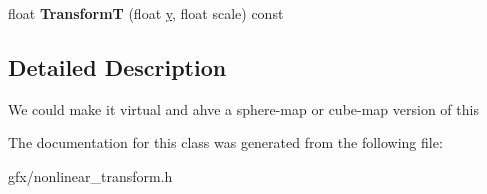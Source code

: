 \begin{DoxyCompactItemize}
\item 
float {\bfseries TransformT} (float \hyperlink{IceUtils_8h_aa7ffaed69623192258fb8679569ff9ba}{y}, float scale) const \hypertarget{classIdentityTransform_ab473c2f60a64238a9d69a45ec53b1869}{}\label{classIdentityTransform_ab473c2f60a64238a9d69a45ec53b1869}

\end{DoxyCompactItemize}


\subsection{Detailed Description}
We could make it virtual and ahve a sphere-\/map or cube-\/map version of this 

The documentation for this class was generated from the following file\+:\begin{DoxyCompactItemize}
\item 
gfx/nonlinear\+\_\+transform.\+h\end{DoxyCompactItemize}
